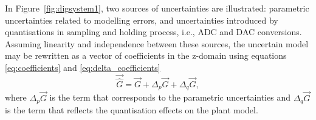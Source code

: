 \documentclass{sig-alternate-05-2015}
\newcommand{\red}[1]{{\color{red}#1}}
\begin{document}
%
In Figure~\ref{fig:digsystem1}, two sources of uncertainties are
illustrated: parametric uncertainties related to modelling errors, and
uncertainties introduced by quantisations in sampling and holding process,
i.e., ADC and DAC conversions.  Assuming linearity and independence between
these sources, the uncertain model may be rewritten as a vector of coefficients in the z-domain using equations \ref{eq:coefficients} and \ref{eq:delta_coefficients}
%
\begin{equation}
\label{eq:complete_unc_model}
\vec{\hat{G}}=\vec{G}+\Delta_p \vec{G}+\Delta_q \vec{G},
\end{equation}
%
where $\Delta_p \vec{G}$ is the term that corresponds to the parametric
uncertainties and $\Delta_q \vec{G}$ is the term that reflects the
quantisation effects on the plant model.

\end{document}
